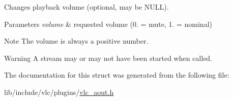 Changes playback volume (optional, may be N\+U\+LL). 
\begin{DoxyParams}{Parameters}
{\em volume} & requested volume (0. = mute, 1. = nominal) \\
\hline
\end{DoxyParams}
\begin{DoxyNote}{Note}
The volume is always a positive number. 
\end{DoxyNote}
\begin{DoxyWarning}{Warning}
A stream may or may not have been started when called. 
\end{DoxyWarning}


The documentation for this struct was generated from the following file\+:\begin{DoxyCompactItemize}
\item 
lib/include/vlc/plugins/\hyperlink{vlc__aout_8h}{vlc\+\_\+aout.\+h}\end{DoxyCompactItemize}
